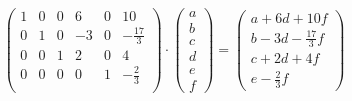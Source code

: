 \documentclass[a4paper,10pt]{article}
\begin{document}
\begin{equation}
 \begin{pmatrix}
  1 & 0 & 0 & 6 & 0 & 10\\
  0 & 1 & 0 & -3 & 0 & -\frac{17}{3}\\
  0 & 0 & 1 & 2 & 0 & 4\\
  0 & 0 & 0 & 0 & 1 & -\frac{2}{3}\\
 \end{pmatrix} \cdot \begin{pmatrix}a\\b\\c\\d\\e\\f\end{pmatrix} =
 \begin{pmatrix}
  a + 6d + 10f\\
  b - 3d - \frac{17}{3}f\\
  c + 2d + 4f\\
  e - \frac{2}{3}f
 \end{pmatrix}
\end{equation}
\end{document}
